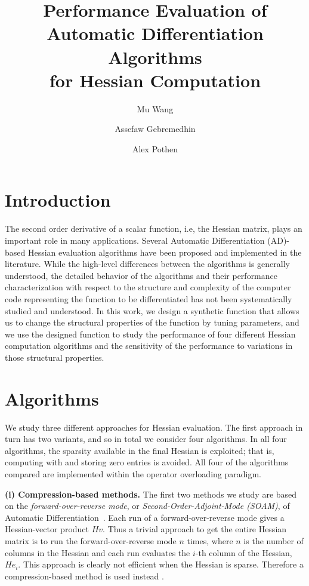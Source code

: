 \documentclass[11pt, a4paper, english]{article}
\begin{document}
\title{Performance Evaluation of Automatic Differentiation Algorithms \\ for Hessian Computation}
\author[1]{Mu Wang}
\author[2]{Assefaw Gebremedhin}
\author[1]{Alex Pothen}
\date{}
\maketitle

\section*{Introduction}
The second order derivative of a scalar function, i.e, the Hessian matrix, plays 
an important role in many applications. 
Several Automatic Differentiation (AD)-based Hessian evaluation algorithms have been proposed and implemented in the literature. While the high-level differences between the algorithms is generally understood, the detailed behavior of the algorithms and their performance characterization with respect to the structure and complexity of the computer code  representing the function to be differentiated has not been systematically studied and understood. In this work, we design a synthetic function that allows us to change the structural properties of the function by tuning parameters, and we use the designed function to study the performance of four different Hessian computation algorithms and the sensitivity of the performance to variations in those structural properties.

\section*{Algorithms}

We study three different approaches for Hessian evaluation. The first approach in turn has two variants, and so in total we consider four algorithms. In all four algorithms, 
the sparsity available in the final Hessian is exploited; that is, computing with and storing zero entries is avoided. All four of the algorithms compared are implemented within the operator overloading paradigm. 

{\bf (i) Compression-based methods. }
The first two methods we study are based on the {\em forward-over-reverse mode}, or {\em Second-Order-Adjoint-Mode (SOAM)}, of Automatic Differentiation~\cite{griewank2008evaluating, naumann2012art}. Each run of a forward-over-reverse mode gives a Hessian-vector product $Hv$. Thus a trivial approach to get the entire Hessian matrix is to run the forward-over-reverse mode $n$ times, where $n$ is the number of columns in the Hessian and each run evaluates the $i$-th column of the Hessian, $He_i$. This approach is clearly not efficient  when the Hessian is sparse.  Therefore a compression-based method is used instead \cite{gebremedhin2009efficient}. 
\end{document}
